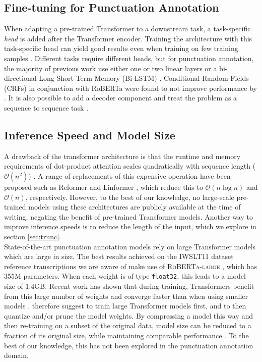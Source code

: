 \documentclass[bsc,deptreport,ai]{infthesis} %
\begin{document}
\subsection{Fine-tuning for Punctuation Annotation}
\label{sec:finetuning}
When adapting a pre-trained Transformer to a downstream task, a task-specific \emph{head} is added after the Transformer encoder. Training the architecture with this task-specific head can yield good results even when training on few training samples \citep{huggingface}. Different tasks require different heads, but for punctuation annotation, the majority of previous work use either one or two linear layers \citep{chen2020controllable,sotapunctuation} or a bi-directional Long Short-Term Memory (Bi-LSTM) \citep{yi2020adversarial}. Conditional Random Fields (CRFs) in conjunction with RoBERTa were found to not improve performance by \citet{sotapunctuation}. It is also possible to add a decoder component and treat the problem as a sequence to sequence task \citep{yi2019speech2vec}.

\subsection{Inference Speed and Model Size}
\label{sec:speed}
A drawback of the transformer architecture is that the runtime and memory requirements of dot-product attention scales quadratically with sequence length ($\mathcal{O}(n^2)$) \citep{tay2020efficient}. A range of replacements of this expensive operation have been proposed such as Reformer \citep{kitaev2020reformer} and Linformer \citep{wang2020linformer}, which reduce this to $\mathcal{O}(n\log{}n)$ and $\mathcal{O}(n)$, respectively. However, to the best of our knowledge, no large-scale pre-trained models using these architectures are publicly available at the time of writing, negating the benefit of pre-trained Transformer models. Another way to improve inference speeds is to reduce the length of the input, which we explore in section \ref{sec:trunc}.\\ State-of-the-art punctuation annotation models rely on large Transformer models which are large in size. The best results achieved on the IWSLT11 dataset reference transcriptions we are aware of make use of \textsc{RoBERTa-large} \citep{sotapunctuation}, which has 355M parameters. When each weight is of type \texttt{float32}, this leads to a model size of 1.4GB. Recent work has shown that during training, Transformers benefit from this large number of weights and converge faster than when using smaller models \citep{li2020train}. \citet{li2020train} therefore suggest to train large Transformer models first, and to then quantize and/or prune the model weights. By compressing a model this way and then re-training on a subset of the original data, model size can be reduced to a fraction of its original size, while maintaining comparable performance \citep{han2016compression}. To the best of our knowledge, this has not been explored in the punctuation annotation domain.
\end{document}
